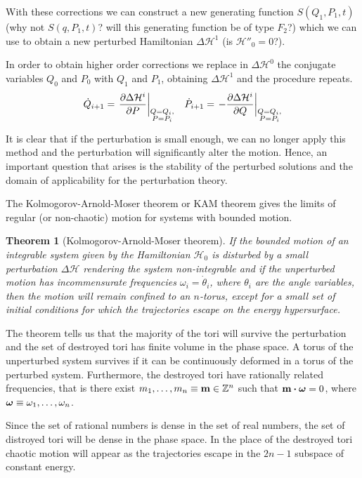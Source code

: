 \documentclass[../thesis.tex]{subfiles}
\theoremstyle{plain}
\newtheorem*{theorem*}{Theorem}
\begin{document}
{\color{red}With these corrections we can construct a new generating function
\(S(Q_1,P_1,t)\) (why not \(S(q,P_1,t)\)?
will this generating function be of type \(F_2\)?) which we can use to obtain
a new perturbed Hamiltonian \(\Delta \mathcal{H}^1\) (is \(\mathcal{H''}_0 = 0\)?)}.

In order to obtain higher order corrections we replace in \(\Delta \mathcal{H}^0\)
the conjugate variables \(Q_0\) and \(P_0\) with \(Q_1\) and \(P_1\),
obtaining \(\Delta \mathcal{H}^1\) and the procedure repeats.
\begin{align*}
  \dot{Q}_{i+1} = \eval{\pdv{\Delta \mathcal{H}^i}{P}}_{\substack{Q=Q_i,\\P=P_i}} &&
  \dot{P}_{i+1} = \eval{-\pdv{\Delta \mathcal{H}^i}{Q}}_{\substack{Q=Q_i,\\P=P_i}}
\end{align*}

It is clear that if the perturbation is small enough, we can no longer apply
this method and the perturbation will significantly alter the motion.
Hence, an important question that arises is the stability of the perturbed solutions
and the domain of applicability for the perturbation theory.

The Kolmogorov-Arnold-Moser theorem or KAM theorem gives the limits of regular (or
non-chaotic) motion for systems with bounded motion.


\begin{theorem*}[Kolmogorov-Arnold-Moser theorem]
  If the bounded motion of an integrable system given by the Hamiltonian \(\mathcal{H}_0\)
  is disturbed by a small perturbation \(\Delta \mathcal{H}\) rendering the system
  non-integrable and if the unperturbed motion has {\color{red}incommensurate}
  frequencies \(\omega_i=\dot{\theta}_i\), where \(\theta_i\) are the angle
  variables, then the motion will remain confined to an \(n\)-torus, except for
  a small set of initial conditions for which the trajectories escape on the
  energy hypersurface.
\end{theorem*}

The theorem tells us that the majority of the tori will survive the perturbation
and the set of destroyed tori has finite volume in the phase space.
A torus of the unperturbed system survives if it can be continuously deformed
in a torus of the perturbed system.
Furthermore, the destroyed tori have rationally related frequencies, that is
there exist \(m_1,\dotsc,m_n \equiv \vb{m} \in \mathbb{Z}^n\) such that
\(\vb{m} \vdot \vb*{\omega} = 0\), where \(\vb*{\omega} \equiv \omega_1,\dotsc,\omega_n\).

Since the set of rational numbers is {\color{red}dense} in the set of real numbers,
the set of distroyed tori will be {\color{red}dense in the phase space}. In the
place of the destroyed tori chaotic motion will appear as the trajectories escape
in the \(2n-1\) subspace of constant energy.
\end{document}
